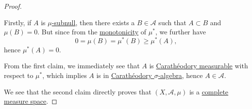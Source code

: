 \begin{proof}
\begin{explanation}
		\par Firstly, if \(A\) is \hyperref[def:mu-subnull-set]{\(\mu \)-subnull}, then there exists a \(B\in \mathcal{A} \) such that \(A\subset B\) and \(\mu (B) = 0\). But since from
		the \hyperref[def:outer-measure-montonicity]{monotonicity} of \(\mu ^{\ast} \), we further have
		\[
			0 = \mu(B) = \mu ^{\ast} (B) \geq \mu ^{\ast} (A),
		\]
		hence \(\mu ^{\ast} (A) = 0\).

		\par  From the first claim, we immediately see that \(A\) is \hyperref[def:C-measurable]{Carathéodory measurable} with respect to \(\mu ^{\ast}\),
		which implies \(A\) is in \hyperref[thm:Caratheodory-extension-Thm]{Carathéodory \(\sigma\)-algebra}, hence \(A\in \mathcal{A} \).
	\end{explanation}

	We see that the second claim directly proves that \((X, \mathcal{A} , \mu )\) is a \hyperref[def:complete-measure-space]{complete measure space}.
\end{proof}


